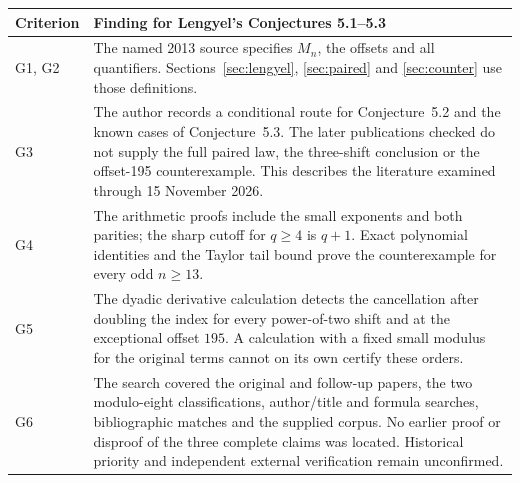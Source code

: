 \documentclass[11pt,a4paper]{article}
\begin{document}
\begin{center}\small
\begin{tabularx}{\linewidth}{@{}p{.13\linewidth}X@{}}
\toprule
Criterion & Finding for Lengyel's Conjectures 5.1--5.3 \\
\midrule
G1, G2 & The named 2013 source specifies $M_n$, the offsets and all
quantifiers. Sections~\ref{sec:lengyel}, \ref{sec:paired} and \ref{sec:counter} use those definitions.\\
G3 & The author records a conditional route for Conjecture~5.2 and the
known cases of Conjecture~5.3. The later publications checked do not
supply the full paired law, the three-shift conclusion or the offset-195 counterexample. This describes the literature
examined through 15 November 2026.\\
G4 & The arithmetic proofs include the small exponents and both parities;
the sharp cutoff for $q\ge4$ is $q+1$. Exact polynomial identities and
the Taylor tail bound prove the counterexample for every odd $n\ge13$.\\
G5 & The dyadic derivative calculation detects the cancellation after
doubling the index for every power-of-two shift and at the exceptional
offset $195$. A calculation with a fixed
small modulus for the original terms cannot on its own certify these orders.\\
G6 & The search covered the original and follow-up papers, the two modulo-eight
classifications, author/title and formula searches, bibliographic matches
and the supplied corpus. No earlier proof or disproof of the three complete claims was located. Historical
priority and independent external verification remain unconfirmed.\\
\bottomrule
\end{tabularx}
\end{center}
\end{document}
